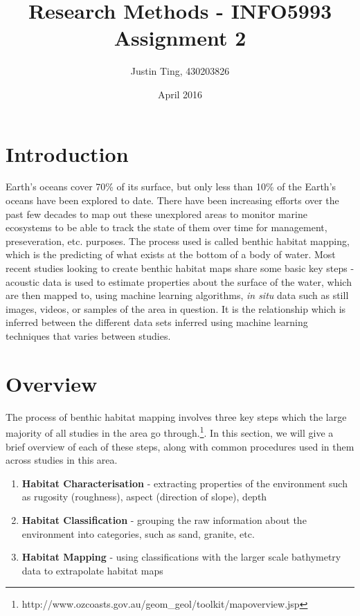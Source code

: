 \documentclass[12pt]{article}
\title{Research Methods - INFO5993 Assignment 2}
\author{Justin Ting, 430203826}
\date{April 2016}
\begin{document}
\maketitle

        \begin{multicols}{2}
            \section{Introduction}

            Earth's oceans cover 70\% of its surface, but only less than 10\% of the Earth's oceans have been explored to date.\citep{NOAA} There have been increasing efforts over the past few decades to map out these unexplored areas to monitor marine ecosystems to be able to track the state of them over time for management, preseveration, etc. purposes. The process used is called benthic habitat mapping, which is the predicting of what exists at the bottom of a body of water. Most recent studies looking to create benthic habitat maps share some basic key steps - acoustic data is used to estimate properties about the surface of the water, which are then mapped to, using machine learning algorithms, \textit{in situ} data such as still images, videos, or samples of the area in question. It is the relationship which is inferred between the different data sets inferred using machine learning techniques that varies between studies.

            \section{Overview}
            The process of benthic habitat mapping involves three key steps which the large majority of all studies in the area go through.\footnote{http://www.ozcoasts.gov.au/geom\_geol/toolkit/mapoverview.jsp}. In this section, we will give a brief overview of each of these steps, along with common procedures used in them across studies in this area.

            \begin{enumerate}
                \item \textbf{Habitat Characterisation} - extracting properties of the environment such as rugosity (roughness), aspect (direction of slope), depth
                \item \textbf{Habitat Classification} - grouping the raw information about the environment into categories, such as sand, granite, etc.
                \item \textbf{Habitat Mapping} - using classifications with the larger scale bathymetry data to extrapolate habitat maps 
            \end{enumerate}


\end{multicols}
\end{document}
